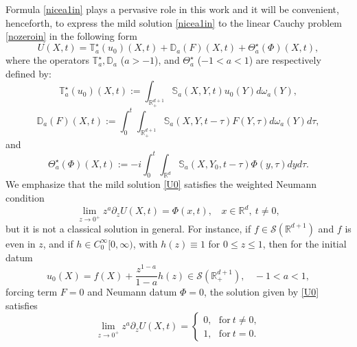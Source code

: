\documentclass[11pt,letter]{amsart}
\def \RN {\mathbb{R}_+^{d+1}}
\def \R {\mathbb{R}}
\newcommand{\Rd}{\mathbb R^d}
\newcommand{\p}{\partial}
\numberwithin{equation}{section}
\numberwithin{equation}{section}
\begin{document}
Formula \eqref{nicea1in} plays a pervasive role in this work and it will be convenient, henceforth,
 to express the mild solution \eqref{nicea1in} to the linear Cauchy problem \eqref{nozeroin} in the following form
\begin{equation}\label{U0}
U(X,t) = \mathbb T^\star_a(u_0)(X,t) + \mathbb D_a(F)(X,t) + \Theta^\star_a(\Phi)(X,t),
\end{equation}
where the operators $\mathbb T^\star_a, \mathbb D_a$ ($a>-1$), and $\Theta_a^\star$ ($-1<a<1$) are respectively defined by:
\begin{equation}\label{Tstar}
\mathbb T_a^\star(u_0)(X,t) := \int_{\RN} \mathbb S_a(X,Y,t) u_0(Y)d\omega_a(Y),
\end{equation}
\begin{equation}\label{Da}
\mathbb D_a(F)(X,t) := \int_0^t \int_{\RN} \mathbb S_a(X,Y,t-\tau) F(Y,\tau) d\omega_a(Y) d\tau,
\end{equation}
and
\begin{equation}\label{Thetastar}
\Theta_a^\star(\Phi)(X,t) := -i \int_0^{t} \int_{\Rd}  \mathbb S_a(X,Y_0,t-\tau) \Phi(y,\tau) dy d\tau.
\end{equation}
We emphasize that the mild solution \eqref{U0} satisfies the weighted Neumann condition
\[
\underset{z\to 0^+}{\lim} z^a \p_z U(X,t) = \Phi(x,t),\ \ \ \ x\in \Rd,\ t\not= 0,
\]
but it is not a classical solution in general. For instance, if $f\in \mathscr S(\R^{d+1})$ and $f$ is even in $z$, and if $h\in C_0^\infty[0,\infty)$, with $h(z) \equiv 1$ for $0\le z \le 1$, then for the initial datum
\begin{equation}\label{piccolou}
u_0(X) = f(X) + \frac{z^{1-a}}{1-a} h(z)\in  \mathscr S(\RN),\ \ \ \ -1<a<1,
\end{equation}
forcing term $F = 0$ and Neumann datum $\Phi = 0$, the solution given by \eqref{U0} satisfies   
\[
\underset{z\to 0^+}{\lim} z^a \p_z U(X,t) = \begin{cases}0,\ \ \ \text{for}\ t\not= 0,
\\
1,\ \ \ \text{for}\ t = 0.
\end{cases}
\]
\end{document}
